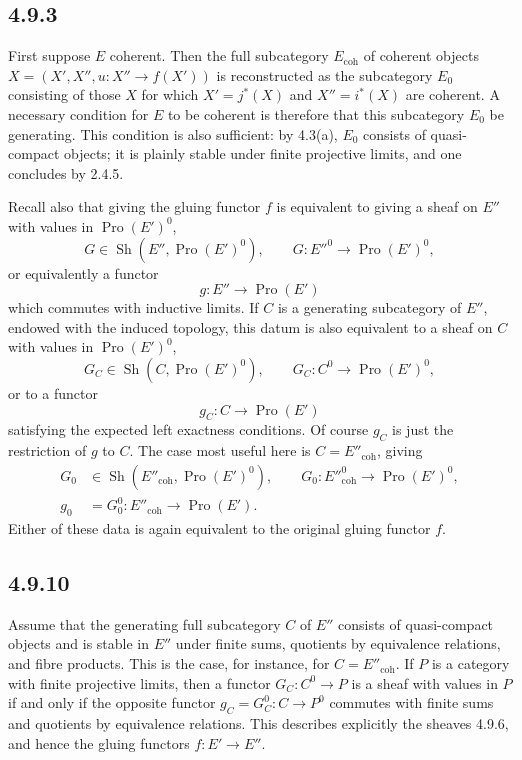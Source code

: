 \documentclass[11pt]{article}
\newcommand{\Pro}{\operatorname{Pro}}
\newcommand{\coh}{\mathrm{coh}}
\begin{document}
\subsection*{4.9.3}
First suppose \(E\) coherent. Then the full subcategory \(E_{\coh}\) of coherent objects \(X=(X',X'',u:X''\to f(X'))\) is reconstructed as the subcategory \(E_0\) consisting of those \(X\) for which \(X'=j^*(X)\) and \(X''=i^*(X)\) are coherent. A necessary condition for \(E\) to be coherent is therefore that this subcategory \(E_0\) be generating. This condition is also sufficient: by 4.3(a), \(E_0\) consists of quasi-compact objects; it is plainly stable under finite projective limits, and one concludes by 2.4.5.

Recall also that giving the gluing functor \(f\) is equivalent to giving a sheaf on \(E''\) with values in \(\Pro(E')^0\),
\[
 G\in \operatorname{Sh}(E'',\Pro(E')^0),\qquad G:{E''}^0\to\Pro(E')^0, \tag{4.9.4}
\]
or equivalently a functor
\[
 g:E''\to \Pro(E') \tag{4.9.5}
\]
which commutes with inductive limits. If \(C\) is a generating subcategory of \(E''\), endowed with the induced topology, this datum is also equivalent to a sheaf on \(C\) with values in \(\Pro(E')^0\),
\[
 G_C\in \operatorname{Sh}(C,\Pro(E')^0),\qquad G_C:C^0\to\Pro(E')^0, \tag{4.9.6}
\]
or to a functor
\[
 g_C:C\to\Pro(E') \tag{4.9.7}
\]
satisfying the expected left exactness conditions. Of course \(g_C\) is just the restriction of \(g\) to \(C\). The case most useful here is \(C=E''_{\coh}\), giving
\begin{align}
 G_0&\in \operatorname{Sh}(E''_{\coh},\Pro(E')^0),\qquad G_0:{E''}_{\coh}^0\to\Pro(E')^0, \tag{4.9.8}\\
 g_0&=G_0^0:E''_{\coh}\to\Pro(E'). \tag{4.9.9}
\end{align}
Either of these data is again equivalent to the original gluing functor \(f\).

\subsection*{4.9.10}
Assume that the generating full subcategory \(C\) of \(E''\) consists of quasi-compact objects and is stable in \(E''\) under finite sums, quotients by equivalence relations, and fibre products. This is the case, for instance, for \(C=E''_{\coh}\). If \(P\) is a category with finite projective limits, then a functor \(G_C:C^0\to P\) is a sheaf with values in \(P\) if and only if the opposite functor \(g_C=G_C^0:C\to P^0\) commutes with finite sums and quotients by equivalence relations. This describes explicitly the sheaves 4.9.6, and hence the gluing functors \(f:E'\to E''\).
\end{document}
